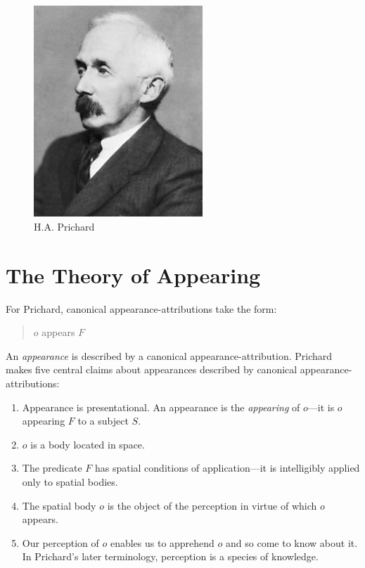 \documentclass[11pt]{article}
\title{\mytitle\\
\mysubtitle}
\author{\myauthor}
\date{} %
\begin{document}
\maketitle

\setlength{\parindent}{1em}


\begin{figure}[htbp]
    \centering
        \includegraphics[scale=.5]{../../graphics/prichard.jpg}
    \caption{H.A. Prichard}
    \label{fig:prichard}
\end{figure}

\section{The Theory of Appearing} %
\label{sec:the_theory_of_appearing}
For Prichard, canonical appearance-attributions take the form:
    \begin{quote}
        \( o \) appears \( F \)
    \end{quote}
An \emph{appearance} is described by a canonical appearance-attribution. Prichard makes five central claims about appearances described by canonical appearance-attributions:
    \begin{enumerate}
        \item Appearance is presentational. An appearance is the \emph{appearing} of \( o \)---it is \( o \) appearing \( F \) to a subject \( S \).
        \item \( o \) is a body located in space.
        \item The predicate \( F \) has spatial conditions of application---it is intelligibly applied only to spatial bodies.
        \item The spatial body \( o \) is the object of the perception in virtue of which \( o \) appears.
        \item Our perception of \( o \) enables us to apprehend \( o \) and so come to know about it. In Prichard's later terminology, perception is a species of knowledge.
    \end{enumerate}
\end{document}
